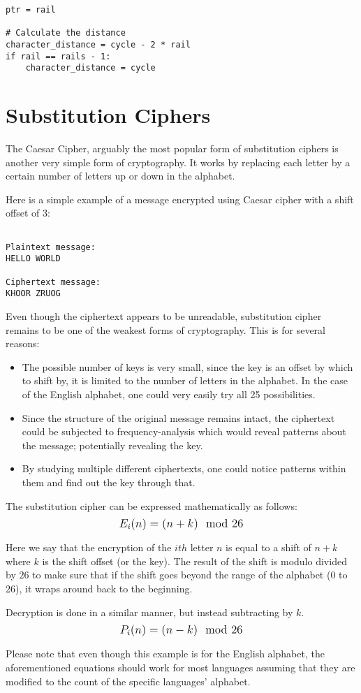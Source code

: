 \begin{verbatim}
ptr = rail

# Calculate the distance
character_distance = cycle - 2 * rail
if rail == rails - 1:
    character_distance = cycle
\end{verbatim} 

\section{Substitution Ciphers}

The Caesar Cipher, arguably the most popular form of substitution ciphers is another very simple form of cryptography. 
It works by replacing each letter by a certain number of letters up or down in the alphabet. 

Here is a simple example of a message encrypted using Caesar cipher with a shift offset of 3:

\begin{verbatim}

Plaintext message: 
HELLO WORLD
               
Ciphertext message:
KHOOR ZRUOG
\end{verbatim}

Even though the ciphertext appears to be unreadable, substitution cipher remains to be one of the weakest forms of cryptography. 
This is for several reasons:
\begin{itemize}  
    \item The possible number of keys is very small, since the key is an offset by which to shift by, it is limited to the number of letters in the alphabet.
    In the case of the English alphabet, one could very easily try all 25 possibilities. 
    \item Since the structure of the original message remains intact, the ciphertext could be subjected to frequency-analysis which would reveal patterns about the message;
    potentially revealing the key.
    \item By studying multiple different ciphertexts, one could notice patterns within them and find out the key through that.
\end{itemize}

The substitution cipher can be expressed mathematically as follows: $$\mathlarger{E_i(n)=(n+k)\mod{26}}$$

Here we say that the encryption of the $ith$ letter $n$ is equal to a shift of $n+k$ where $k$ is the shift offset (or the key). The result of the shift
is modulo divided by $26$ to make sure that if the shift goes beyond the range of the alphabet (0 to 26),  it wraps around back to the beginning.

Decryption is done in a similar manner, but instead subtracting by $k$. $$\mathlarger{P_i(n)=(n-k)\mod{26}}$$

Please note that even though this example is for the English alphabet, the aforementioned equations should work for most languages assuming that they are modified
to the count of the specific languages' alphabet.

